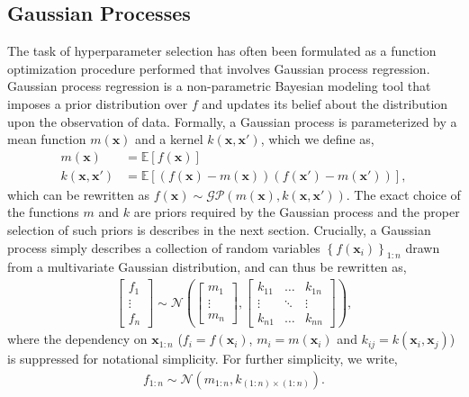 \documentclass{article}
\newcommand{\x}{\mathbf{x}}
\newcommand{\N}[1]{\mathcal{N}\left(#1\right)}
\newcommand{\set}[1]{\left\{{#1}\right\}}
\newcommand{\E}[1]{\mathbb{E}\left[#1\right]}
\begin{document}
\subsection{Gaussian Processes}
The task of hyperparameter selection has often been formulated as a function optimization procedure performed that involves Gaussian process regression. Gaussian process regression is a non-parametric Bayesian modeling tool that imposes a prior distribution over $f$ and updates its belief about the distribution upon the observation of data. Formally, a Gaussian process is parameterized by a mean function $m(\x)$ and a kernel $k(\x, \x')$, which we define as,
\begin{align}
  m(\x) &= \E{f(\x)} \\
  k(\x, \x') &= \E{(f(\x) - m(\x))(f(\x') - m(\x'))},
\end{align}
which can be rewritten as $f(\x) \sim \mathcal{GP}(m(\x), k(\x, \x'))$. The exact choice of the functions $m$ and $k$ are priors required by the Gaussian process and the proper selection of such priors is describes in the next section. Crucially, a Gaussian process simply describes a collection of random variables $\set{f(\x_i)}_{1:n}$ drawn from a multivariate Gaussian distribution, and can thus be rewritten as,
\begin{align}
  \begin{bmatrix}
    f_1 \\ \vdots \\ f_n
  \end{bmatrix} \sim
  \N{\begin{bmatrix} m_1 \\ \vdots \\ m_n \end{bmatrix},
    \begin{bmatrix}
      k_{11} & \ldots & k_{1n} \\
      \vdots & \ddots & \vdots \\
      k_{n1} & \ldots & k_{nn}
  \end{bmatrix}},
\end{align}
where the dependency on $\x_{1:n}$ ($f_i = f(\x_i)$, $m_i = m(\x_i)$ and $k_{ij} = k(\x_i, \x_j)$) is suppressed for notational simplicity. For further simplicity, we write,
\begin{align}
  f_{1:n} \sim \N{m_{1:n}, k_{(1:n) \times (1:n)}}.
\end{align}
\end{document}
